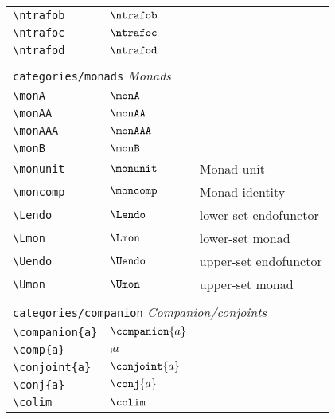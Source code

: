 \begin{longtable}{lll}
 {\color[rgb]{0.5,0.5,0.5}\texttt{\textbackslash ntrafob}} & $\ntrafob$ & \\ 
 {\color[rgb]{0.5,0.5,0.5}\texttt{\textbackslash ntrafoc}} & $\ntrafoc$ & \\ 
 {\color[rgb]{0.5,0.5,0.5}\texttt{\textbackslash ntrafod}} & $\ntrafod$ & \\ 
  &  & \\ 
 \multicolumn{3}{l}{{\color[rgb]{0.5,0.5,0.5}\texttt{categories/monads}} \emph{Monads}}\\ 
 \hline
{\color[rgb]{0.5,0.5,0.5}\texttt{\textbackslash monA}} & $\monA$ & \\ 
 {\color[rgb]{0.5,0.5,0.5}\texttt{\textbackslash monAA}} & $\monAA$ & \\ 
 {\color[rgb]{0.5,0.5,0.5}\texttt{\textbackslash monAAA}} & $\monAAA$ & \\ 
 {\color[rgb]{0.5,0.5,0.5}\texttt{\textbackslash monB}} & $\monB$ & \\ 
 {\color[rgb]{0.5,0.5,0.5}\texttt{\textbackslash monunit}} & $\monunit$ &  Monad unit\\ 
 {\color[rgb]{0.5,0.5,0.5}\texttt{\textbackslash moncomp}} & $\moncomp$ &  Monad identity\\ 
 {\color[rgb]{0.5,0.5,0.5}\texttt{\textbackslash Lendo}} & $\Lendo$ &  lower-set endofunctor\\ 
 {\color[rgb]{0.5,0.5,0.5}\texttt{\textbackslash Lmon}} & $\Lmon$ &  lower-set monad\\ 
 {\color[rgb]{0.5,0.5,0.5}\texttt{\textbackslash Uendo}} & $\Uendo$ &  upper-set endofunctor\\ 
 {\color[rgb]{0.5,0.5,0.5}\texttt{\textbackslash Umon}} & $\Umon$ &  upper-set monad\\ 
  &  & \\ 
 \multicolumn{3}{l}{{\color[rgb]{0.5,0.5,0.5}\texttt{categories/companion}} \emph{Companion/conjoints}}\\ 
 \hline
{\color[rgb]{0.5,0.5,0.5}\texttt{\textbackslash companion\{a\}}} & $\companion{a}$ & \\ 
 {\color[rgb]{0.5,0.5,0.5}\texttt{\textbackslash comp\{a\}}} & $\comp{a}$ & \\ 
 {\color[rgb]{0.5,0.5,0.5}\texttt{\textbackslash conjoint\{a\}}} & $\conjoint{a}$ & \\ 
 {\color[rgb]{0.5,0.5,0.5}\texttt{\textbackslash conj\{a\}}} & $\conj{a}$ & \\ 
 {\color[rgb]{0.5,0.5,0.5}\texttt{\textbackslash colim}} & $\colim$ & \\ 

\end{longtable}
